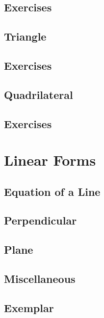 \documentclass[11pt]{book}
\begin{document}
\section{Exercises}

\section{Triangle}

\section{Exercises}

\section{ Quadrilateral}

\section{Exercises}

%
\chapter{Linear Forms}
\section{Equation of a Line}

\section{Perpendicular}

\section{Plane}

\section{Miscellaneous }

\section{Exemplar}

\end{document}
